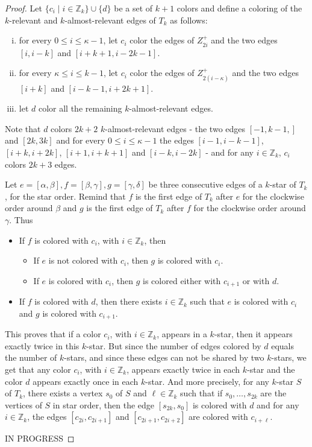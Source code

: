 \documentclass[12pt]{amsart}
\begin{document}
\begin{proof}
Let $\{c_i\;|\; i\in\mathbb{Z}_k\}\cup\{d\}$ be a set of $k+1$ colors and define a coloring of the $k$-relevant and $k$-almost-relevant edges of $T_k$ as follows:
\begin{enumerate}[(i)]
\item for every $0\le i\le \kappa-1$, let $c_i$ color the edges of $Z_{2i}^+$ and the two edges $[i,i-k]$ and $[i+k+1,i-2k-1]$.
\item for every $\kappa\le i\le k-1$, let $c_i$ color the edges of $Z_{2(i-\kappa)}^+$ and the two edges $[i+k]$ and $[i-k-1,i+2k+1]$.
\item let $d$ color all the remaining $k$-almost-relevant edges.
\end{enumerate}
Note that $d$ colors $2k+2$ $k$-almost-relevant edges - the two edges $[-1,k-1,]$ and $[2k,3k]$ and for every $0\le i\le \kappa-1$ the edges $[i-1,i-k-1]$, $[i+k,i+2k]$, $[i+1,i+k+1]$ and $[i-k,i-2k]$ - and for any $i\in\mathbb{Z}_k$, $c_i$ colors $2k+3$ edges.

Let $e=[\alpha,\beta],f=[\beta,\gamma],g=[\gamma,\delta]$ be three consecutive edges of a $k$-star of $T_k$, for the star order.
Remind that $f$ is the first edge of $T_k$ after $e$ for the clockwise order around $\beta$ and $g$ is the first edge of $T_k$ after $f$ for the clockwise order around $\gamma$.
Thus
\begin{itemize}
\item If $f$ is colored with $c_i$, with $i\in\mathbb{Z}_{k}$, then
\begin{itemize}
\item If $e$ is not colored with $c_i$, then $g$ is colored with $c_i$.
\item If $e$ is colored with $c_i$, then $g$ is colored either with $c_{i+1}$ or with $d$.
\end{itemize}
\item If $f$ is colored with $d$, then there exists $i\in\mathbb{Z}_{k}$ such that $e$ is colored with $c_i$ and $g$ is colored with $c_{i+1}$.
\end{itemize}

This proves that if a color $c_i$, with $i\in\mathbb{Z}_{k}$, appears in a $k$-star, then it appears exactly twice in this $k$-star. But since the number of edges colored by $d$ equals the number of $k$-stars, and since these edges can not be shared by two $k$-stars, we get that any color $c_i$, with $i\in\mathbb{Z}_{k}$, appears exactly twice in each $k$-star and the color $d$ appears exactly once in each $k$-star. And more precisely, for any $k$-star $S$ of $T_k$, there exists a vertex $s_0$ of $S$ and $\ell\in\mathbb{Z}_k$ such that if $s_0,\ldots,s_{2k}$ are the vertices of $S$ in star order, then the edge $[s_{2k},s_0]$ is colored with $d$ and for any $i\in\mathbb{Z}_k$, the edges $[c_{2i},c_{2i+1}]$ and $[c_{2i+1},c_{2i+2}]$ are colored with $c_{i+\ell}$.

\bigskip
IN PROGRESS
\end{proof}
\end{document}
